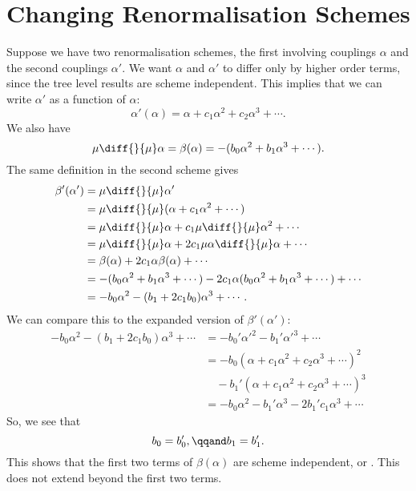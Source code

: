 \documentclass[fleqn]{NotesClass}
\begin{document}
    \section{Changing Renormalisation Schemes}
    Suppose we have two renormalisation schemes, the first involving couplings \(\alpha\) and the second couplings \(\alpha'\).
    We want \(\alpha\) and \(\alpha'\) to differ only by higher order terms, since the tree level results are scheme independent.
    This implies that we can write \(\alpha'\) as a function of \(\alpha\):
    \begin{equation}
        \alpha'(\alpha) = \alpha + c_1\alpha^2 + c_2\alpha^3 + \dotsb.
    \end{equation}
    We also have
    \begin{equation}
        \mu \diff{}{\mu} \alpha = \beta(\alpha) = -(b_0\alpha^2 + b_1\alpha^3 + \dotsb).
    \end{equation}
    The same definition in the second scheme gives
    \begin{align}
        \beta'(\alpha') &= \mu \diff{}{\mu} \alpha'\\
        &= \mu\diff{}{\mu} (\alpha + c_1 \alpha^2 + \dotsb)\\
        &= \mu\diff{}{\mu} \alpha + c_1 \mu \diff{}{\mu} \alpha^2 + \dotsb\\
        &= \mu\diff{}{\mu} \alpha + 2 c_1 \mu \alpha \diff{}{\mu} \alpha + \dotsb\\
        &= \beta(\alpha) + 2c_1 \alpha\beta(\alpha) + \dotsb\\
        &= -(b_0\alpha^2 + b_1\alpha^3 + \dotsb) - 2c_1\alpha(b_0\alpha^2 + b_1\alpha^3 + \dotsb) + \dotsb\\
        &= -b_0\alpha^2 - (b_1 + 2c_1b_0) \alpha^3 + \dotsb.
    \end{align}
    We can compare this to the expanded version of \(\beta'(\alpha')\):
    \begin{align}
        -b_0\alpha^2 - (b_1 + 2c_1b_0)\alpha^3 + \dotsb &= -b_0'\alpha'^2 - b_1'\alpha'^3 + \dotsb\\
        &= -b_0(\alpha + c_1\alpha^2 + c_2\alpha^3 + \dotsb)^2\\
        &\quad - b_1'(\alpha + c_1\alpha^2 + c_2\alpha^3 + \dotsb)^3\\
        &= -b_0\alpha^2 - b_1'\alpha^3 - 2b_1'c_1\alpha^3 + \dotsb
    \end{align}
    So, we see that
    \begin{equation}
        b_0 = b_0', \qqand b_1 = b_1'.
    \end{equation}
    This shows that the first two terms of \(\beta(\alpha)\) are scheme independent, or .
    This does not extend beyond the first two terms.
    
\end{document}

